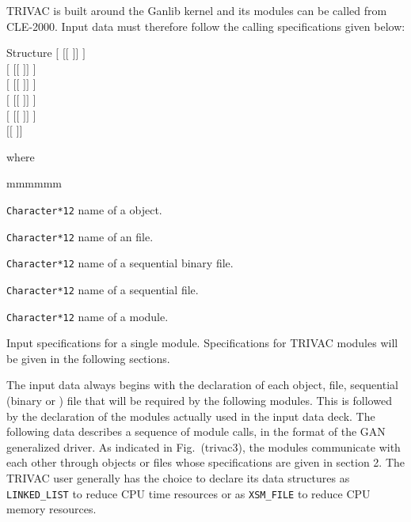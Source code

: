 TRIVAC is built around the Ganlib kernel and its modules can be called from CLE-2000.\cite{ganlib5,cle2000} Input data must therefore follow the calling specifications given below:

\begin{DataStructure}{Structure }
$[$  $[[$  $]]$ \moc{;} $]$ \\
$[$  $[[$  $]]$ \moc{;} $]$ \\
$[$  $[[$  $]]$ \moc{;} $]$ \\
$[$  $[[$  $]]$ \moc{;} $]$ \\
$[$  $[[$  $]]$ \moc{;} $]$ \\
$[[$  $]]$ \\
\end{DataStructure}

\noindent where
\begin{ListeDeDescription}{mmmmmm}

\item[\dusa{NAME1}] {\tt Character*12} name of a  object.

\item[\dusa{NAME2}] {\tt Character*12} name of an  file.

\item[\dusa{NAME3}] {\tt Character*12} name of a sequential binary file.

\item[\dusa{NAME4}] {\tt Character*12} name of a sequential  file.

\item[\dusa{NAME5}] {\tt Character*12} name of a module.

\item[\dstr{specif}] Input specifications for a single module. Specifications for TRIVAC modules will be given in the following sections.

\end{ListeDeDescription}

The input data always begins with the declaration of each  object, 
file, sequential (binary or ) file that will be required
by the following modules. This is followed by the declaration of the modules actually used in the input data deck. The following data describes a sequence of module calls, in the format of the GAN generalized driver. As indicated in Fig.~\fig(trivac3), the modules communicate with each other through  objects or  files whose specifications are given in section 2. The TRIVAC user generally has the choice to declare its data structures as {\tt LINKED\_LIST} to reduce CPU time resources or as {\tt XSM\_FILE} to reduce CPU memory resources.

